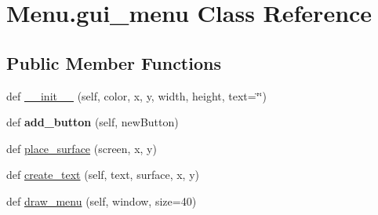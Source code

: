 \hypertarget{class_menu_1_1gui__menu}{}\section{Menu.\+gui\+\_\+menu Class Reference}
\label{class_menu_1_1gui__menu}
\subsection*{Public Member Functions}
\begin{DoxyCompactItemize}
\item 
def \hyperlink{class_menu_1_1gui__menu_a7f56e985286036aab075ffc3ad231aaa}{\+\_\+\+\_\+init\+\_\+\+\_\+} (self, color, x, y, width, height, text=\char`\"{}\char`\"{})
\item 
\mbox{\label{class_menu_1_1gui__menu_aae3e5243bb14a11d0daa50d46282bf58}} 
def {\bfseries add\+\_\+button} (self, new\+Button)
\item 
def \hyperlink{class_menu_1_1gui__menu_a13a81e60fa37eb7624bb08ce0c2a8706}{place\+\_\+surface} (screen, x, y)
\item 
def \hyperlink{class_menu_1_1gui__menu_aaf07fce7fe5c6d6d48e2a0a2d93895e8}{create\+\_\+text} (self, text, surface, x, y)
\item 
def \hyperlink{class_menu_1_1gui__menu_a3d96db0e51b2161312b216e946513f53}{draw\+\_\+menu} (self, window, size=40)
\end{DoxyCompactItemize}
